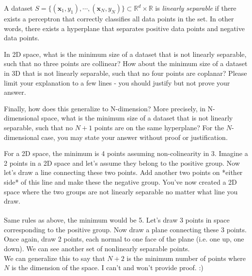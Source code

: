 \begin{problem}[4]
  A dataset $S = \{(\mathbf{x}_1, y_1),\cdots,(\mathbf{x}_N, y_N)\} \subset \mathbb{R}^d \times \mathbb{R}$ is \emph{linearly separable} if there exists a perceptron that correctly classifies all data points in the set. In other words, there exists a hyperplane that separates positive data points and negative data points.

  In 2D space, what is the minimum size of a dataset that is not linearly separable, such that no three points are collinear? How about the minimum size of a dataset in 3D that is not linearly separable, such that no four points are coplanar? Please limit your explanation to a few lines - you should justify but not prove your answer.

  Finally, how does this generalize to N-dimension? More precisely, in N-dimensional space, what is the minimum size of a dataset that is not linearly separable, such that no $N+1$ points are on the same hyperplane? For the $N$-dimensional case, you may state your answer without proof or justification.
\end{problem}
\begin{solution}
For a 2D space, the minimum is 4 points assuming non-colinearity in 3. Imagine a 2 points in a 2D space and let's assume they belong to the positive group. Now let's draw a line connecting these two points. Add another two points on *either side* of this line and make these the negative group. You've now created a 2D space where the two groups are not linearly separable no matter what line you draw.\\
\\
Same rules as above, the minimum would be 5. Let's draw 3 points in space corresponding to the positive group. Now draw a plane connecting these 3 points. Once again, draw 2 points, each normal to one face of the plane (i.e. one up, one down). We can see another set of nonlinearly separable points.
\\
We can generalize this to say that $N+2$ is the minimum number of points where $N$ is the dimension of the space. I can't and won't provide proof. :)
\end{solution}

